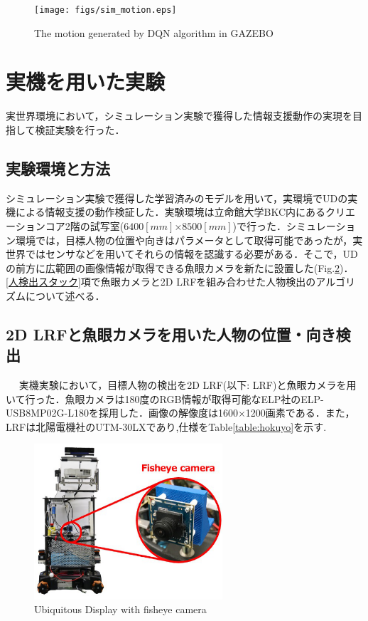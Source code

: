 \documentclass[12pt]{sonota/aislab}
\begin{document}
\begin{figure}[t]
\begin{center}
\texttt{[image: figs/sim\_motion.eps]}
\caption{The motion generated by DQN algorithm in GAZEBO}
\label{sim_experiment_motion}
\end{center}
\end{figure}

\clearpage

\section{実機を用いた実験}
実世界環境において，シミュレーション実験で獲得した情報支援動作の実現を目指して検証実験を行った．

\subsection{実験環境と方法}
シミュレーション実験で獲得した学習済みのモデルを用いて，実環境でUDの実機による情報支援の動作検証した．実験環境は立命館大学BKC内にあるクリエーションコア2階の試写室($6400[mm]$×$8500[mm]$)で行った．シミュレーション環境では，目標人物の位置や向きはパラメータとして取得可能であったが，実世界ではセンサなどを用いてそれらの情報を認識する必要がある．そこで，UDの前方に広範囲の画像情報が取得できる魚眼カメラを新たに設置した(Fig.\ref{ud_with_fisheyecamera})．\ref{人検出スタック}項で魚眼カメラと2D LRFを組み合わせた人物検出のアルゴリズムについて述べる．

\subsection{2D LRFと魚眼カメラを用いた人物の位置・向き検出}　\label{人検出スタック}
実機実験において，目標人物の検出を2D LRF(以下: LRF)と魚眼カメラを用いて行った．魚眼カメラは180度のRGB情報が取得可能なELP社のELP-USB8MP02G-L180を採用した．画像の解像度は1600×1200画素である．また，LRFは北陽電機社のUTM-30LXであり,仕様をTable\ref{table:hokuyo}を示す.

\begin{figure}[t]
\begin{center}
\includegraphics[clip, width=7cm]{figs/ud_with_fisheyecamera.eps}
\caption{Ubiquitous Display with fisheye camera}
\label{ud_with_fisheyecamera}
\end{center}
\end{figure}
\end{document}
